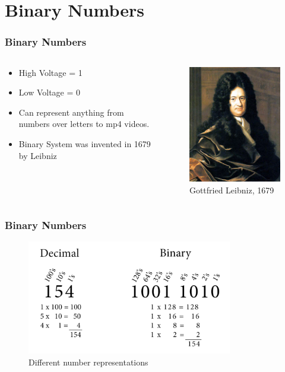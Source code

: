 \documentclass{beamer}
\begin{document}
\section{Binary Numbers}
\begin{frame}\frametitle{Binary Numbers}
  \begin{columns}
  \begin{column}{6cm}
  \begin{itemize}
   \item High Voltage = 1
   \item Low Voltage = 0
   \item Can represent anything from numbers over letters to mp4 videos.
   \item Binary System was invented in 1679 by Leibniz
  \end{itemize}

  \end{column}
  \begin{column}{6cm}
  \begin{figure}
  \includegraphics[height=0.7\textheight]{leibniz}
  \caption{Gottfried Leibniz, 1679}
  \end{figure}
  \end{column}
  \end{columns}
\end{frame}


\begin{frame}\frametitle{Binary Numbers}
  \begin{figure}
  \includegraphics[width=0.8\textwidth]{dec_vs_bin}
  \caption{Different number representations}
  \end{figure}
\end{frame}
\end{document}
